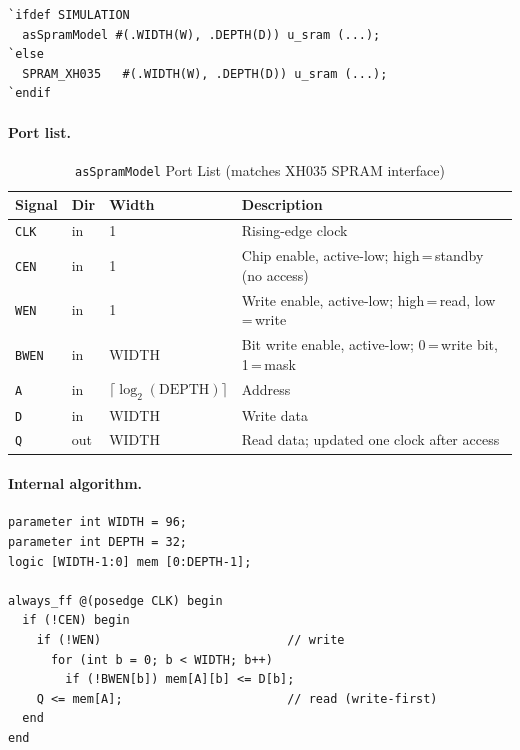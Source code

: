 \begin{verbatim}
`ifdef SIMULATION
  asSpramModel #(.WIDTH(W), .DEPTH(D)) u_sram (...);
`else
  SPRAM_XH035   #(.WIDTH(W), .DEPTH(D)) u_sram (...);
`endif
\end{verbatim}

\paragraph{Port list.}

\begin{table}[H]
\caption{\texttt{asSpramModel} Port List (matches XH035 SPRAM interface)}
\label{tab:asSpramModelPorts}
\centering
\begin{tabularx}{\textwidth}{|l |l |l |X|}
  \hline
  Signal & Dir & Width & Description \\
  \hline
  \hline
  \texttt{CLK}  & in  & 1     & Rising-edge clock \\
  \hline
  \texttt{CEN}  & in  & 1     & Chip enable, active-low; high\,=\,standby (no access) \\
  \hline
  \texttt{WEN}  & in  & 1     & Write enable, active-low; high\,=\,read, low\,=\,write \\
  \hline
  \texttt{BWEN} & in  & WIDTH & Bit write enable, active-low; 0\,=\,write bit, 1\,=\,mask \\
  \hline
  \texttt{A}    & in  & $\lceil\log_2(\text{DEPTH})\rceil$ & Address \\
  \hline
  \texttt{D}    & in  & WIDTH & Write data \\
  \hline
  \texttt{Q}    & out & WIDTH & Read data; updated one clock after access \\
  \hline
\end{tabularx}
\end{table}

\paragraph{Internal algorithm.}
\begin{verbatim}
parameter int WIDTH = 96;
parameter int DEPTH = 32;
logic [WIDTH-1:0] mem [0:DEPTH-1];

always_ff @(posedge CLK) begin
  if (!CEN) begin
    if (!WEN)                          // write
      for (int b = 0; b < WIDTH; b++)
        if (!BWEN[b]) mem[A][b] <= D[b];
    Q <= mem[A];                       // read (write-first)
  end
end
\end{verbatim}

